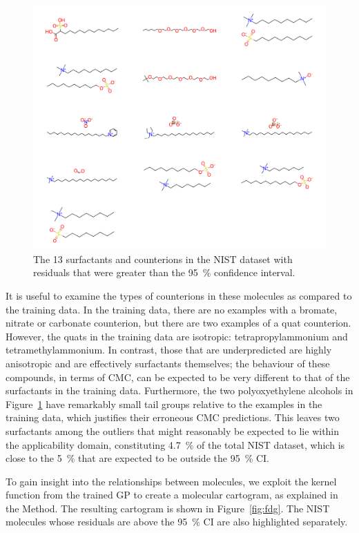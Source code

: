 \begin{figure}
    \includegraphics[width=\textwidth]{images/nist-underpred.pdf}
    \caption{The 13 surfactants and counterions in the NIST dataset with residuals
        that were greater than the \SI{95}{\%} confidence interval.}
    \label{fig:nist-underpred}
\end{figure}

It is useful to examine the types of counterions in these molecules as compared
to the training data. In the training data, there are no examples with a
bromate, nitrate or carbonate counterion, but there are two examples of a quat
counterion. However, the quats in the training data are isotropic:
tetrapropylammonium and tetramethylammonium. In contrast, those that are
underpredicted are highly anisotropic and are effectively surfactants
themselves; the behaviour of these compounds, in terms of CMC, can be expected
to be very different to that of the surfactants in the training data.
Furthermore, the two polyoxyethylene alcohols in Figure~\ref{fig:nist-underpred}
have remarkably small tail groups relative to the examples in the training data,
which justifies their erroneous CMC predictions. This leaves two surfactants
among the outliers that might reasonably be expected to lie within the
applicability domain, constituting \SI{4.7}{\%} of the total NIST dataset, which
is close to the \SI{5}{\%} that are expected to be outside the \SI{95}{\%} CI.

To gain insight into the relationships between molecules, we exploit the kernel
function from the trained GP to create a molecular cartogram, as explained in
the Method. The resulting cartogram is shown in Figure~\ref{fig:fdg}. The NIST
molecules whose residuals are above the \SI{95}{\%} CI are also highlighted
separately.

